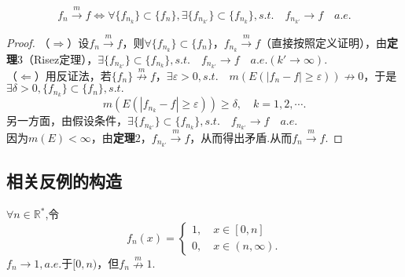 \documentclass[bwprint, withoutpreface]{cumcmthesis}
\begin{document}
\begin{theorem}[Risez定理的一个应用]
	\begin{equation*}
		f_n \stackrel{m}{\longrightarrow} f \Leftrightarrow \forall \{f_{n_k}\} \subset \{f_n\}, \exists \{f_{n_{k'}}\} \subset \{f_{n_k}\}, s.t. \quad f_{n_{k'}} \to f \quad a.e.		
	\end{equation*}
\end{theorem}

\begin{proof}
	（$\Rightarrow$）设$f_n \stackrel{m}{\longrightarrow}f$，则$\forall \{f_{n_k}\} \subset \{f_n\}$，$f_{n_k} \stackrel{m}{\longrightarrow} f$（直接按照定义证明），由\textbf{定理$3$}（Risez定理），$\exists \{f_{n_{k'}}\} \subset \{f_{n_k}\}, s.t. \quad f_{n_{k'}} \to f \quad a.e. (k' \to \infty).$ \\
	（$\Leftarrow$）用反证法，若$\{f_n\} \stackrel{m}{\nrightarrow} f$，$\exists \varepsilon > 0, s.t. \quad m(E(|f_n - f| \geqslant \varepsilon)) \nrightarrow 0$，于是$\exists \delta > 0, \{f_{n_k}\} \subset \{f_n\}, s.t.$ \[m(E(|f_{n_k} - f| \geqslant \varepsilon)) \geqslant \delta, \quad k = 1, 2, \cdots.\]另一方面，由假设条件，$\exists \{f_{n_{k'}}\} \subset \{f_{n_k}\}, s.t. \quad f_{n_{k'}} \to f \quad a.e.$ \\
	因为$m(E) < \infty$，由\textbf{定理$2$}，$f_{n_{k'}} \stackrel{m}{\longrightarrow} f$，从而得出矛盾.从而$f_n \stackrel{m}{\longrightarrow} f$.
\end{proof}

\subsection{相关反例的构造}
\begin{example}[几乎处处收敛不能推出依测度收敛]
	$\forall n \in \mathbb{R}^*$,令
	\begin{equation*}
	f_n(x) = 
	\begin{cases}
		1, \quad x \in [0, n] \\
		0, \quad x \in (n, \infty).
	\end{cases}
	\end{equation*}
	$f_n \to 1, a.e. \mbox{于}[0, n)$，但$f_n \stackrel{m}{\nrightarrow} 1.$
\end{example}
\end{document}
